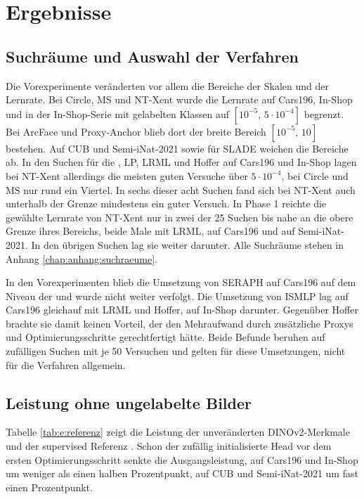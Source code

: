 \chapter{Ergebnisse}
\label{chap:ergebnisse}



\section{Suchräume und Auswahl der Verfahren}
\label{sec:e:phase0}

Die Vorexperimente veränderten vor allem die Bereiche der Skalen und der Lernrate. Bei Circle, \ac{MS} und \ac{NT-Xent} wurde die Lernrate auf Cars196, In-Shop und in der In-Shop-Serie mit gelabelten Klassen auf $[10^{-5},\,5\cdot10^{-4}]$ begrenzt. Bei ArcFace und Proxy-Anchor blieb dort der breite Bereich $[10^{-5},\,10]$ bestehen. Auf \ac{CUB} und Semi-iNat-2021 sowie für \ac{SLADE} weichen die Bereiche ab. In den Suchen für die \UEBL, \ac{LP}, \ac{LRML} und Hoffer auf Cars196 und In-Shop lagen bei \ac{NT-Xent} allerdings die meisten guten Versuche über $5\cdot10^{-4}$, bei Circle und \ac{MS} nur rund ein Viertel. In sechs dieser acht Suchen fand sich bei \ac{NT-Xent} auch unterhalb der Grenze mindestens ein guter Versuch. In Phase 1 reichte die gewählte Lernrate von \ac{NT-Xent} nur in zwei der 25 Suchen bis nahe an die obere Grenze ihres Bereichs, beide Male mit \ac{LRML}, auf Cars196 und auf Semi-iNat-2021. In den übrigen Suchen lag sie weiter darunter. Alle Suchräume stehen in Anhang \ref{chap:anhang:suchraeume}.

In den Vorexperimenten blieb die Umsetzung von \ac{SERAPH} auf Cars196 auf dem Niveau der \UEBL und wurde nicht weiter verfolgt. Die Umsetzung von \ac{ISMLP} lag auf Cars196 gleichauf mit \ac{LRML} und Hoffer, auf In-Shop darunter. Gegenüber Hoffer brachte sie damit keinen Vorteil, der den Mehraufwand durch zusätzliche Proxys und Optimierungsschritte gerechtfertigt hätte. Beide Befunde beruhen auf zufälligen Suchen mit je 50 Versuchen und gelten für diese Umsetzungen, nicht für die Verfahren allgemein.


\section{Leistung ohne ungelabelte Bilder}
\label{sec:e:ausgangslage}

Tabelle \ref{tab:e:referenz} zeigt die Leistung der unveränderten DINOv2-Merkmale und der supervised Referenz \UEBL. Schon der zufällig initialisierte Head vor dem ersten Optimierungsschritt senkte die Ausgangsleistung, auf Cars196 und In-Shop um weniger als einen halben Prozentpunkt, auf \ac{CUB} und Semi-iNat-2021 um fast einen Prozentpunkt.%

